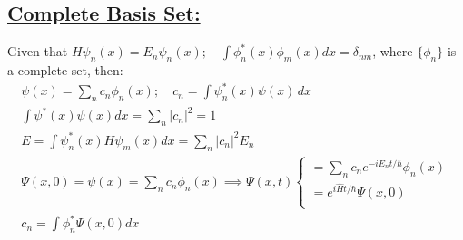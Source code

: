 \subsection*{\underline{Complete Basis Set:}}
Given that $H\psi_n(x)=E_n\psi_n(x);\quad \int\phi^*_n(x)\phi_m(x)dx=\delta_{nm}$, where $\{\phi_n\}$ is a complete set, then:
\begin{gather}
    \psi(x)=\sum_nc_n\phi_n(x);\quad c_n=\int\psi^*_n(x)\psi(x)\,dx\\
    \int\psi^*(x)\psi(x)dx=\sum_n|c_n|^2=1\\
    E=\int\psi^*_n(x)H\psi_m(x)dx=\sum_n|c_n|^2E_n\\
    \Psi(x,0)=\psi(x)=\sum_nc_n\phi_n(x)\implies\Psi(x,t)
    \begin{cases}
        =\sum_nc_ne^{-iE_nt/\hbar}\phi_n(x) \\
        =e^{i\hat H t/\hbar}\Psi(x,0)       \\
    \end{cases}
    \\ c_n=\int\phi_n^*\Psi(x,0)dx
\end{gather}